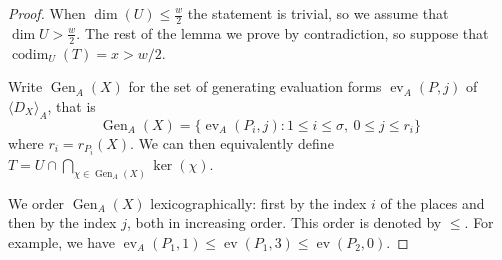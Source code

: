 \documentclass[10pt,a4paper]{amsart}
\DeclareMathOperator{\Gen}{Gen}
\newcommand{\codim}{\operatorname{codim}}
\newcommand{\divi}[1]{\langle #1 \rangle}
\DeclareMathOperator{\ev}{ev}
\renewcommand{\leq}{\leqslant}
\begin{document}
	\begin{proof}
		When $\dim (U) \leq \frac w 2$ the statement is trivial, so we assume that $\dim U > \frac w2$. The rest of the lemma we prove by contradiction, so suppose that $\codim_U(T) = x > w/2$. 
		
		Write $\operatorname{Gen}_A(X)$ for the set of generating evaluation forms $\ev_A(P, j)$ of $\divi {D_X}_A$, that is
		$$ \Gen_{A}(X)= \{\ev_{A}(P_i,j):1\le i\le \sigma,\ 0\le j\le r_i\} $$
		where $r_i= r_{P_i} (X)$. We can then equivalently define $T = U \cap \bigcap_{\chi \in \Gen_{A}(X)} \ker(\chi).$
		
		We order $\Gen_A(X)$ lexicographically: first by the index $i$ of the places and then by the index $j$, both in increasing order. This order is denoted by $\leq$. For example, we have $\ev_A(P_1, 1) \leq \ev(P_1, 3) \leq \ev(P_2, 0).$ 
		

\end{proof}
\end{document}
